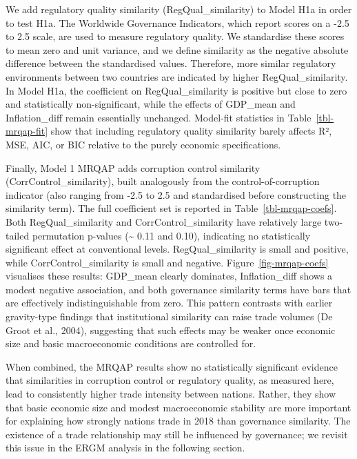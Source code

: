\documentclass[
]{article}
\begin{document}
We add regulatory quality similarity (RegQual\_similarity) to Model H1a
in order to test H1a. The Worldwide Governance Indicators, which report
scores on a -2.5 to 2.5 scale, are used to measure regulatory quality.
We standardise these scores to mean zero and unit variance, and we
define similarity as the negative absolute difference between the
standardised values. Therefore, more similar regulatory environments
between two countries are indicated by higher RegQual\_similarity. In
Model H1a, the coefficient on RegQual\_similarity is positive but close
to zero and statistically non-significant, while the effects of
GDP\_mean and Inflation\_diff remain essentially unchanged. Model-fit
statistics in Table~\ref{tbl-mrqap-fit} show that including regulatory
quality similarity barely affects R², MSE, AIC, or BIC relative to the
purely economic specifications.

Finally, Model 1 MRQAP adds corruption control similarity
(CorrControl\_similarity), built analogously from the
control-of-corruption indicator (also ranging from -2.5 to 2.5 and
standardised before constructing the similarity term). The full
coefficient set is reported in Table~\ref{tbl-mrqap-coefs}. Both
RegQual\_similarity and CorrControl\_similarity have relatively large
two-tailed permutation p-values (\textasciitilde{} 0.11 and 0.10),
indicating no statistically significant effect at conventional levels.
RegQual\_similarity is small and positive, while CorrControl\_similarity
is small and negative. Figure~\ref{fig-mrqap-coefs} visualises these
results: GDP\_mean clearly dominates, Inflation\_diff shows a modest
negative association, and both governance similarity terms have bars
that are effectively indistinguishable from zero. This pattern contrasts
with earlier gravity-type findings that institutional similarity can
raise trade volumes (De Groot et al., 2004), suggesting that such
effects may be weaker once economic size and basic macroeconomic
conditions are controlled for.

When combined, the MRQAP results show no statistically significant
evidence that similarities in corruption control or regulatory quality,
as measured here, lead to consistently higher trade intensity between
nations. Rather, they show that basic economic size and modest
macroeconomic stability are more important for explaining how strongly
nations trade in 2018 than governance similarity. The existence of a
trade relationship may still be influenced by governance; we revisit
this issue in the ERGM analysis in the following section.
\end{document}
